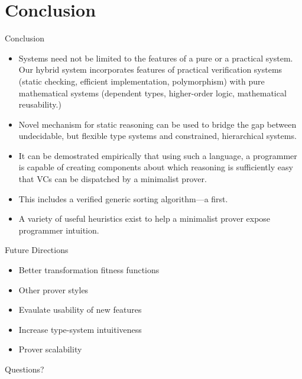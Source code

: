 \documentclass{beamer}
\begin{document}
\section{Conclusion}
\begin{frame}{Conclusion}
	\begin{itemize}
		\item Systems need not be limited to the features of a pure or a practical system. Our hybrid system incorporates features of practical verification systems (static checking, efficient implementation, polymorphism) with pure mathematical systems (dependent types, higher-order logic, mathematical reusability.)
		\item Novel mechanism for static reasoning can be used to bridge the gap between undecidable, but flexible type systems and constrained, hierarchical systems.
		\item It can be demostrated empirically that using such a language, a programmer is capable of creating components about which reasoning is sufficiently easy that VCs can be dispatched by a minimalist prover.
		\item This includes a verified generic sorting algorithm---a first.
		\item A variety of useful heuristics exist to help a minimalist prover expose programmer intuition.
	\end{itemize}
\end{frame}

\begin{frame}{Future Directions}
	\begin{itemize}
		\item Better transformation fitness functions
		\item Other prover styles
		\item Evaulate usability of new features
		\item Increase type-system intuitiveness
		\item Prover scalability
	\end{itemize}
\end{frame}


\begin{frame}{Questions?}
~
\end{frame}
\end{document}
